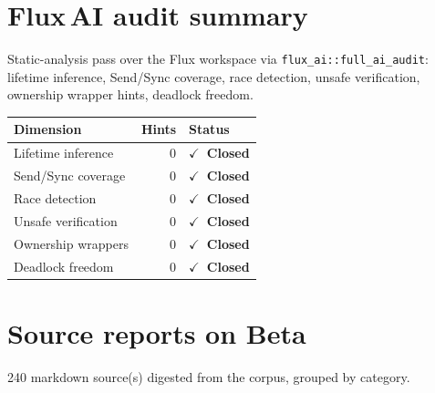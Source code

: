\documentclass[11pt,a4paper]{article}
\newcommand{\statusclosed}{\textcolor{qgreen}{\bfseries $\checkmark$~Closed}}
\begin{document}
\section{Flux\,AI audit summary}
Static-analysis pass over the Flux workspace via \texttt{flux\_ai::full\_ai\_audit}: lifetime inference, Send/Sync coverage, race detection, unsafe verification, ownership wrapper hints, deadlock freedom.

\begin{tabular}{l r l}
\toprule
\textbf{Dimension} & \textbf{Hints} & \textbf{Status}\\
\midrule
Lifetime inference & 0 & \statusclosed\\
Send/Sync coverage & 0 & \statusclosed\\
Race detection & 0 & \statusclosed\\
Unsafe verification & 0 & \statusclosed\\
Ownership wrappers & 0 & \statusclosed\\
Deadlock freedom & 0 & \statusclosed\\
\bottomrule
\end{tabular}

\section{Source reports on Beta}
240 markdown source(s) digested from the corpus, grouped by category.
\end{document}
